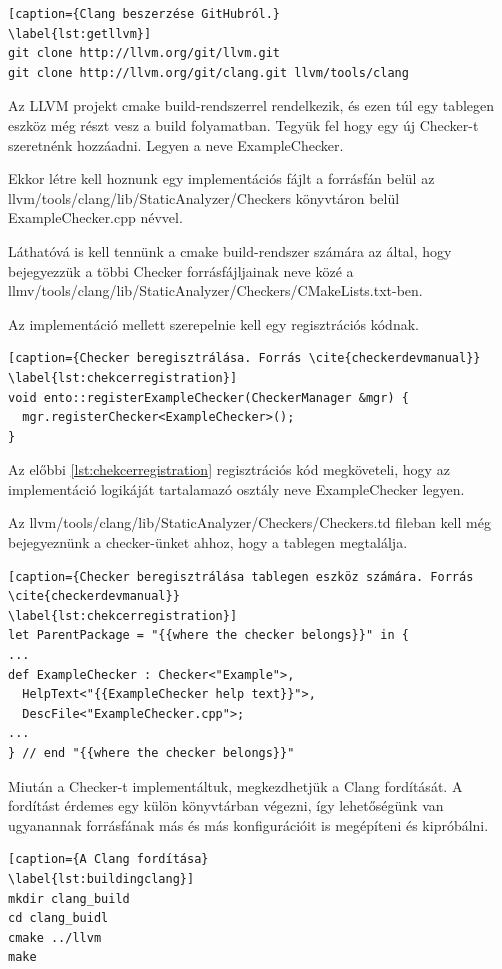 \documentclass[a4paper,12pt]{report}
\begin{document}
\begin{lstlisting}[caption={Clang beszerzése GitHubról.}
\label{lst:getllvm}]
git clone http://llvm.org/git/llvm.git
git clone http://llvm.org/git/clang.git llvm/tools/clang
\end{lstlisting}

Az LLVM projekt cmake build-rendszerrel rendelkezik, és ezen túl egy tablegen eszköz még részt vesz a build folyamatban. Tegyük fel hogy egy új Checker-t szeretnénk hozzáadni. Legyen a neve ExampleChecker.

Ekkor létre kell hoznunk egy implementációs fájlt a forrásfán belül az llvm/tools/clang/lib/StaticAnalyzer/Checkers könyvtáron belül ExampleChecker.cpp névvel.

Láthatóvá is kell tennünk a cmake build-rendszer számára az által, hogy bejegyezzük a többi Checker forrásfájljainak neve közé a llmv/tools/clang/lib/StaticAnalyzer/Checkers/CMakeLists.txt-ben.

Az implementáció mellett szerepelnie kell egy regisztrációs kódnak.

\begin{lstlisting}[caption={Checker beregisztrálása. Forrás \cite{checkerdevmanual}}
\label{lst:chekcerregistration}]
void ento::registerExampleChecker(CheckerManager &mgr) {
  mgr.registerChecker<ExampleChecker>();
}
\end{lstlisting}

Az előbbi \ref{lst:chekcerregistration} regisztrációs kód megköveteli, hogy az implementáció logikáját tartalamazó osztály neve ExampleChecker legyen.

Az llvm/tools/clang/lib/StaticAnalyzer/Checkers/Checkers.td fileban kell még bejegyeznünk a checker-ünket ahhoz, hogy a tablegen megtalálja.

\begin{lstlisting}[caption={Checker beregisztrálása tablegen eszköz számára. Forrás \cite{checkerdevmanual}}
\label{lst:chekcerregistration}]
let ParentPackage = "{{where the checker belongs}}" in {
...
def ExampleChecker : Checker<"Example">,
  HelpText<"{{ExampleChecker help text}}">,
  DescFile<"ExampleChecker.cpp">;
...
} // end "{{where the checker belongs}}"
\end{lstlisting}

Miután a Checker-t implementáltuk, megkezdhetjük a Clang fordítását. A fordítást érdemes egy külön könyvtárban végezni, így lehetőségünk van ugyanannak forrásfának más és más konfigurációit is megépíteni és kipróbálni.

\begin{lstlisting}[caption={A Clang fordítása}
\label{lst:buildingclang}]
mkdir clang_build
cd clang_buidl
cmake ../llvm
make
\end{lstlisting}
\end{document}
